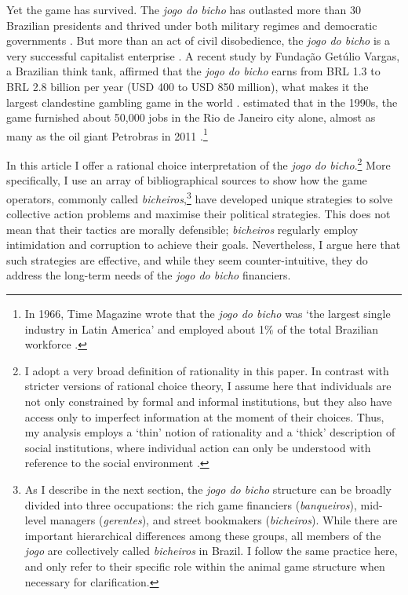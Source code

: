 \documentclass[a4paper,12pt]{article}
\begin{document}
Yet the game has survived. The \textit{jogo do bicho} has outlasted more than 30 Brazilian presidents and thrived under both military regimes and democratic governments \citep{jupiara2015poroes}. But more than an act of civil disobedience, the \textit{jogo do bicho} is a very successful capitalist enterprise \citep{labronici2014sorteio, magalhaes2005ganhou}. A recent study by Fundação Getúlio Vargas, a Brazilian think tank, affirmed that the \textit{jogo do bicho} earns from BRL 1.3 to BRL 2.8 billion per year (USD 400 to USD 850 million), what makes it the largest clandestine gambling game in the world \citep{huff2015jogos}. \citet[171]{schneider1996brazil} estimated that in the 1990s, the game furnished about 50,000 jobs in the Rio de Janeiro city alone, almost as many as the oil giant Petrobras in 2011 \citep{exame2016petrobras}.\footnote{In 1966, Time Magazine wrote that the \textit{jogo do bicho} was `the largest single industry in Latin America' and employed about 1\% of the total Brazilian workforce \citep{time1966bicho}.}

In this article I offer a rational choice interpretation of the \textit{jogo do bicho}.\footnote{I adopt a very broad definition of rationality in this paper. In contrast with stricter versions of rational choice theory, I assume here that individuals are not only constrained by formal and informal institutions, but they also have access only to imperfect information at the moment of their choices. Thus, my analysis employs a `thin' notion of rationality and a `thick' description of social institutions, where individual action can only be understood with reference to the social environment \citep[253]{boettke2001calculation}.} More specifically, I use an array of bibliographical sources to show how the game operators, commonly called \textit{bicheiros},\footnote{As I describe in the next section, the \textit{jogo do bicho} structure can be broadly divided into three occupations: the rich game financiers (\textit{banqueiros}), mid-level managers (\textit{gerentes}), and street bookmakers (\textit{bicheiros}). While there are important hierarchical differences among these groups, all members of the \textit{jogo} are collectively called \textit{bicheiros} in Brazil. I follow the same practice here, and only refer to their specific role within the animal game structure when necessary for clarification.} have developed unique strategies to solve collective action problems and maximise their political strategies. This does not mean that their tactics are morally defensible; \textit{bicheiros} regularly employ intimidation and corruption to achieve their goals. Nevertheless, I argue here that such strategies are effective, and while they seem counter-intuitive, they do address the long-term needs of the \textit{jogo do bicho} financiers. 
\end{document}
